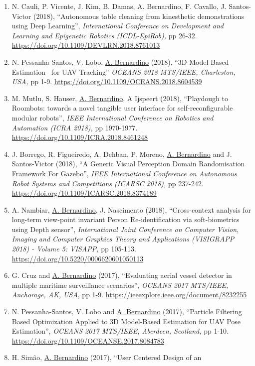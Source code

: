 \documentclass[
]{article}
\begin{document}
\begin{enumerate}
  \url{https://doi.org/10.1109/DEVLRN.2018.8761022}~
\item
  N. Cauli, P. Vicente, J. Kim, B. Damas, A. Bernardino, F. Cavallo, J.
  Santos-Victor (2018), ``Autonomous table cleaning from kinesthetic
  demonstrations using Deep Learning'', \emph{International Conference
  on Development and Learning and Epigenetic Robotics (ICDL-EpiRob),} pp
  26-32. \url{https://doi.org/10.1109/DEVLRN.2018.8761013}~
\item
  N. Pessanha-Santos, V. Lobo, \ul{A. Bernardino} (2018), ``3D
  Model-Based Estimation~ for UAV Tracking'' \emph{OCEANS 2018 MTS/IEEE,
  Charleston, USA,} pp 1-9.
  \url{https://doi.org/10.1109/OCEANS.2018.8604539}~
\item
  M. Mutlu, S. Hauser, \ul{A. Bernardino}, A Ijspeert (2018),
  ``Playdough to Roombots: towards a novel tangible user interface for
  self-reconfigurable modular robots'', \emph{IEEE International
  Conference on Robotics and Automation (ICRA 2018),} pp 1970-1977.
  \url{https://doi.org/10.1109/ICRA.2018.8461248}~~
\item
  J. Borrego, R. Figueiredo, A. Dehban, P. Moreno, \ul{A. Bernardino}
  and J. Santos-Victor (2018), ``A Generic Visual Perception Domain
  Randomisation Framework For Gazebo'', \emph{IEEE International
  Conference on Autonomous Robot Systems and Competitions (ICARSC
  2018),} pp 237-242. \url{https://doi.org/10.1109/ICARSC.2018.8374189}~
\item
  A. Nambiar, \ul{A. Bernardino}, J. Nascimento (2018), ``Cross-context
  analysis for long-term view-point invariant Person Re-identification
  via soft-biometrics using Depth sensor'', \emph{International Joint
  Conference on Computer Vision, Imaging and Computer Graphics Theory
  and Applications (VISIGRAPP 2018) - Volume 5: VISAPP,} pp 105-113.
  \url{https://doi.org/10.5220/0006620601050113}~
\item
  G. Cruz and \ul{A. Bernardino} (2017), ``Evaluating aerial vessel
  detector in multiple maritime surveillance scenarios'', \emph{OCEANS
  2017 MTS/IEEE, Anchorage, AK, USA}, pp 1-9.
  \url{https://ieeexplore.ieee.org/document/8232255}~
\item
  N. Pessanha-Santos, V. Lobo and \ul{A. Bernardino} (2017), ``Particle
  Filtering Based Optimization Applied to 3D Model-Based Estimation for
  UAV Pose Estimation'', \emph{OCEANS 2017 MTS/IEEE, Aberdeen,
  Scotland,} pp 1-10.
  \url{https://doi.org/10.1109/OCEANSE.2017.8084783}~
\item
  H. Simão, \ul{A. Bernardino} (2017), ``User Centered Design of an

\end{enumerate}
\end{document}
